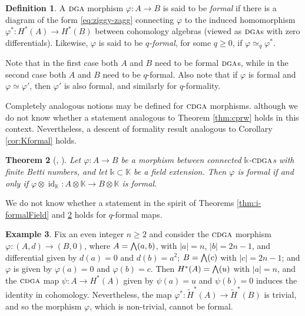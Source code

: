 \documentclass{article}
\numberwithin{equation}{section}
\newtheorem{theorem}{Theorem}[section]
\theoremstyle{definition}
\newtheorem{definition}[theorem]{Definition}
\newtheorem{example}[theorem]{Example}
\newcommand{\K}{\mathbb{K}}
\renewcommand{\k}{\mathbb{k}}
\newcommand{\dga}{\ensuremath{\textsc{dga}}}
\newcommand{\cdga}{\ensuremath{\textsc{cdga}}}
\DeclareMathOperator{\id}{id}
\newcommand{\abs}[1]{\left| #1 \right|}
\newcommand{\bwedge}{\mbox{\normalsize $\bigwedge$}}
\begin{document}
\begin{definition}
\label{def:formal-map}
A $\dga$ morphism $\varphi\colon A\to B$ is said to be {\em formal}\/ if 
there is a diagram of the form \eqref{eq:ziggy-zagg} connecting $\varphi$ 
to the induced homomorphism $\varphi^*\colon H^*(A)\to H^*(B)$ between 
cohomology algebras (viewed as $\dga$s with zero differentials). 
Likewise, $\varphi$ is said to be {\em $q$-formal}, for some $q\ge 0$, if 
$\varphi\simeq_q \varphi^*$.
\end{definition}

Note that in the first case both $A$ and $B$ need to be formal $\dga$s, 
while in the second case both $A$ and $B$ need to be $q$-formal. 
Also note that if $\varphi$ is formal and $\varphi\simeq \varphi'$, 
then $\varphi'$ is also formal, and similarly for $q$-formality.

Completely analogous notions may be defined for $\cdga$ morphisms. 
although we do not know whether a statement analogous 
to Theorem \ref{thm:cprw} holds in this context.  Nevertheless, 
a descent of formality result analogous to Corollary \ref{cor:Kformal}
holds.

\begin{theorem}[\cite{Sullivan77}, \cite{VP79}]
\label{thm:formal-maps}
Let $\varphi\colon A \to B$ be a morphism between 
connected $\k$-$\cdga$s with finite Betti numbers, 
and let $\k\subset \K$ be a field extension.
Then $\varphi$ is formal if and only if 
$\varphi \otimes \id_{\K}\colon A\otimes \K\to B\otimes \K$ is formal.
\end{theorem}

We do not know whether a statement in the spirit of 
Theorems \ref{thm:i-formalField} and \ref{thm:formal-maps} 
holds for $q$-formal maps. 

\begin{example}
\label{ex:hopf-model}
Fix an even integer $n\ge 2$ and consider the $\cdga$ morphism 
$\varphi\colon (A,d)\to (B,0)$, where $A=\bwedge(a,b)$, 
with $\abs{a}=n$, $\abs{b}=2n-1$, and differential given 
by $d(a)=0$ and $d(b)=a^2$; $B=\bwedge(c)$ with $\abs{c}=2n-1$; 
and  $\varphi$ is given by $\varphi(a)=0$ and $\varphi(b)=c$. 
Then $H^*(A)=\bwedge(u)$ with $\abs{a}=n$, and the 
$\cdga$ map $\psi \colon A\to H^*(A)$ given by $\psi(a)=u$ and 
$\psi(b)= 0$ induces the identity in cohomology. Nevertheless, the map 
$\varphi^* \colon \widetilde{H}^*(A)\to \widetilde{H}^*(B)$ is trivial, 
and so the morphism $\varphi$, which is non-trivial, cannot be formal.
\end{example}  
\end{document}
